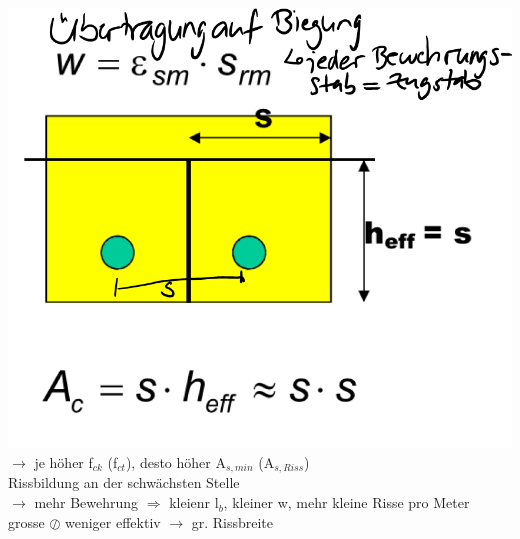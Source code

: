 \begin{minipage}{0.2\linewidth}
		\includegraphics[width=\linewidth]{images/Risse1Zugelement.PNG}
		$ \rightarrow $ je höher f$_{ck}$ (f$_{ct}$), desto höher A$_{s,min}$ (A$_{s,Riss}$) \\
		Rissbildung an der schwächsten Stelle \\
		$ \rightarrow $ mehr Bewehrung $ \Rightarrow $ kleienr l$_b$, kleiner w, mehr kleine Risse pro Meter \\
		grosse $ \oslash $ weniger effektiv $ \rightarrow $ gr. Rissbreite \\	
\end{minipage}







